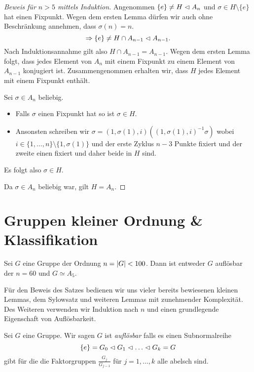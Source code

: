 \begin{proof}[Beweis für $n > 5$ mittels Induktion]
	Angenommen $\{e\} \neq H \vartriangleleft A_{n}$ und $\sigma \in H \setminus \{e\}$ hat einen Fixpunkt.
	Wegen dem ersten Lemma dürfen wir auch ohne Beschränkung annehmen, dass $\sigma(n) = n$.
	\[
	\Rightarrow \{e\}  \neq H \cap A_{n-1} \vartriangleleft A_{n-1}
	.\] 
	Nach Induktionsannahme gilt also $H \cap A_{n-1} = A_{n-1}$.
	Wegen dem ersten Lemma folgt, dass jedes Element von $A_{n}$ mit einem Fixpunkt zu einem Element von $A_{n-1}$ konjugiert ist.
	Zusammengenommen erhalten wir, dass $H$ jedes Element mit einem Fixpunkt enthält.
	
	Sei $\sigma \in A_{n}$ beliebig.
	\begin{itemize}
		\item Falls $\sigma$ einen Fixpunkt hat so ist $\sigma \in H$.
		\item Ansonsten schreiben wir $\sigma = (1,\sigma(1),i)((1,\sigma(1),i)^{-1} \sigma)$
			wobei $i \in \{1,\ldots,n\} \setminus \{1,\sigma(1)\} $ und der erste Zyklus $n-3$ Punkte fixiert und der zweite einen fixiert
			und daher beide in $H$ sind.
	\end{itemize}
	Es folgt also $\sigma \in H$.

	Da $\sigma \in A_{n} $ beliebig war, gilt $H = A_{n}$.
\end{proof}

\section{Gruppen kleiner Ordnung \& Klassifikation}

\begin{theorem}
	Sei $G$ eine Gruppe der Ordnung $n = \abs{G} < 100$. 
	Dann ist entweder $G$ auflösbar der $n = 60$ und $G \simeq A_5$.
\end{theorem}

Für den Beweis des Satzes bedienen wir uns vieler bereits bewiesenen kleinen Lemmas,
dem Sylowsatz und weiteren Lemmas mit zunehmender Komplexität.
Des Weiteren verwenden wir Induktion nach $n$ und einen grundlegende Eigenschaft von Auflösbarkeit.

\begin{definition}[Wiederholung]
	Sei $G$ eine Gruppe. Wir sagen $G$ ist \emph{auflösbar} falls es einen Subnormalreihe
	\[
	\{e\} = G_0 \vartriangleleft G_1 \vartriangleleft \ldots \vartriangleleft G_{k} = G
	\]
	gibt für die die Faktorgruppen $\frac{G_{j}}{G_{j-1}}$ für $j = 1,\ldots,k$ alle abelsch sind.
\end{definition}

